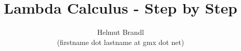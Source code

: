 \documentclass[12pt]{article}
\begin{document}


\title{Lambda Calculus - Step by Step}
\author{Helmut Brandl \\ \scriptsize (firstname dot lastname at gmx dot net)}
\date{}


\maketitle

\tableofcontents

















\end{document}
